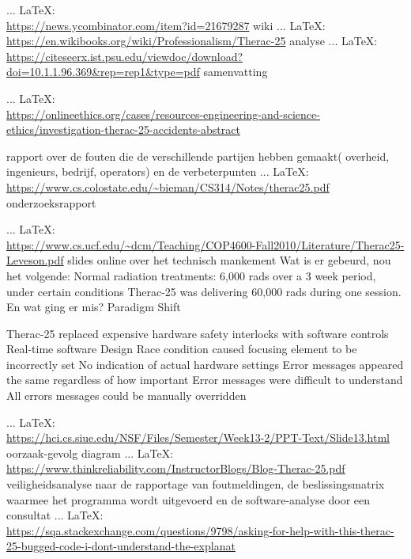 \begin{thebibliography}{99}
 ... \LaTeX:\\ \url{https://news.ycombinator.com/item?id=21679287}
wiki
 ... \LaTeX:\\ \url{https://en.wikibooks.org/wiki/Professionalism/Therac-25}
analyse
 ... \LaTeX:\\ \url{https://citeseerx.ist.psu.edu/viewdoc/download?doi=10.1.1.96.369&rep=rep1&type=pdf}
samenvatting

 ... \LaTeX:\\ \url{https://onlineethics.org/cases/resources-engineering-and-science-ethics/investigation-therac-25-accidents-abstract}

rapport over de fouten die de verschillende partijen hebben gemaakt( overheid, ingenieurs, bedrijf, operators) en de verbeterpunten
 ... \LaTeX:\\ \url{https://www.cs.colostate.edu/~bieman/CS314/Notes/therac25.pdf}
\cite{}
onderzoeksrapport

 ... \LaTeX:\\ \url{https://www.cs.ucf.edu/~dcm/Teaching/COP4600-Fall2010/Literature/Therac25-Leveson.pdf}
\cite{}
slides online over het technisch mankement
Wat is er gebeurd, nou het volgende:
Normal radiation treatments: 6,000 rads over a 3 week period, under certain conditions Therac-25 was delivering 60,000 rads during one session.
En wat ging er mis?
Paradigm Shift

Therac-25 replaced expensive hardware safety interlocks with software controls
Real-time software
Design
Race condition caused focusing element to be incorrectly set
No indication of actual hardware settings
Error messages appeared the same regardless of how important
Error messages were difficult to understand
All errors messages could be manually overridden

 ... \LaTeX:\\ \url{https://hci.cs.siue.edu/NSF/Files/Semester/Week13-2/PPT-Text/Slide13.html}
\cite{}
oorzaak-gevolg diagram
 ... \LaTeX:\\ \url{https://www.thinkreliability.com/InstructorBlogs/Blog-Therac-25.pdf}
\cite{}
veiligheidsanalyse naar de rapportage van foutmeldingen, de beslissingsmatrix waarmee het programma wordt uitgevoerd en de software-analyse door een consultat
 ... \LaTeX:\\ \url{https://sqa.stackexchange.com/questions/9798/asking-for-help-with-this-therac-25-bugged-code-i-dont-understand-the-explanat}





\end{thebibliography}
